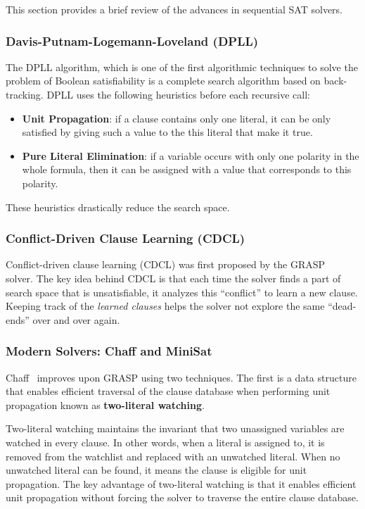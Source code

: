 \documentclass[letterpaper, compsoc, conference]{IEEEtran}
\begin{document}
This section provides a brief review of the advances in sequential SAT solvers.

\subsubsection{Davis-Putnam-Logemann-Loveland (DPLL)}

The DPLL algorithm, which is one of the first algorithmic techniques to solve
the problem of Boolean satisfiability is a complete search algorithm based on
back-tracking. DPLL uses the following heuristics before each recursive call:

\begin{itemize}
\item \textbf{Unit Propagation}: if a clause contains only one literal, it can
be only satisfied by giving such a value to the this literal that make it true. 

\item \textbf{Pure Literal Elimination}: if a variable occurs with only one
polarity in the whole formula, then it can be assigned with a value that
corresponds to this polarity.
\end{itemize}
These heuristics drastically reduce the search space.

\subsubsection{Conflict-Driven Clause Learning (CDCL)}

Conflict-driven clause learning (CDCL) was first proposed by the
GRASP~\cite{GRASP} solver. The key idea behind CDCL is that each time the
solver finds a part of search space that is unsatisfiable, it analyzes this
``conflict'' to learn a new clause. Keeping track of the \emph{learned clauses}
helps the solver not explore the same ``dead-ends'' over and over again.

\subsubsection{Modern Solvers: Chaff and MiniSat} 
Chaff~\cite{CHAFF} improves upon GRASP using two techniques.  The first is a
data structure that enables efficient traversal of the clause database when
performing unit propagation known as \textbf{two-literal watching}.

Two-literal watching maintains the invariant that two unassigned variables are
watched in every clause. In other words, when a literal is assigned to, it is
removed from the watchlist and replaced with an unwatched literal. When no
unwatched literal can be found, it means the clause is eligible for unit
propagation. The key advantage of two-literal watching is that it enables
efficient unit propagation without forcing the solver to traverse the entire
clause database.
\end{document}

